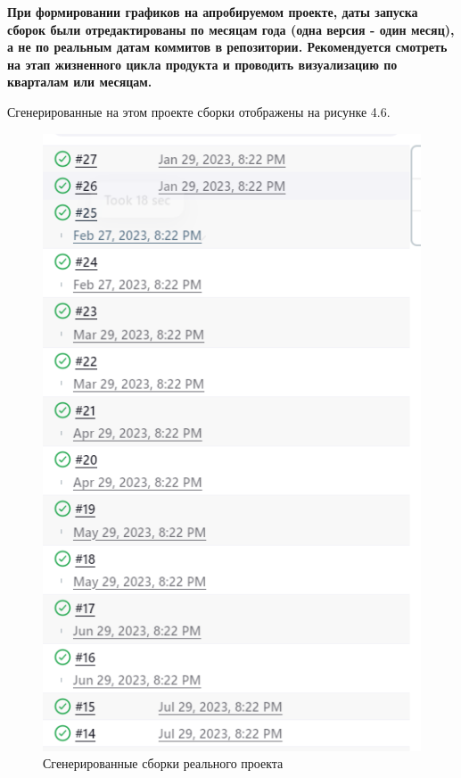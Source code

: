 \textbf{При формировании графиков на апробируемом проекте, даты запуска сборок были отредактированы по месяцам года (одна версия - один месяц), а не по реальным датам коммитов в репозитории. Рекомендуется смотреть на этап жизненного цикла продукта и проводить визуализацию по кварталам или месяцам.}





Сгенерированные на этом проекте сборки отображены на рисунке 4.6.

 \begin{figure}[ht!] 
	\center
	\includegraphics [scale=0.67] {my_folder/images//genetatedBuild}
	\caption{Сгенерированные сборки реального проекта} 
	\label{fig:genetatedBuild}  
\end{figure}

